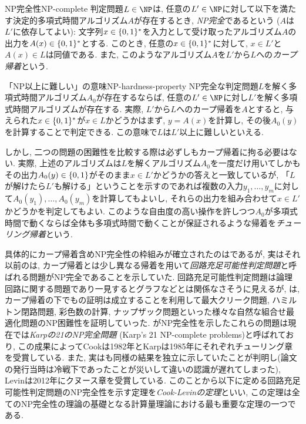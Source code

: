 \begin{definition}{NP完全性}{NP-complete}
  判定問題$L\in \NP$は, 任意の$L'\in\NP$に対して以下を満たす決定的多項式時間アルゴリズム$A$が存在するとき, \emph{NP完全}であるという ($A$は$L'$に依存してよい):
  文字列$x\in\{0,1\}^*$を入力として受け取ったアルゴリズム$A$の出力を$A(x)\in\{0,1\}^*$とする.
  このとき, 任意の$x\in\{0,1\}^*$に対して, $x\in L'$と$A(x)\in L$は同値である.
  また, このようなアルゴリズム$A$を$L'$から$L$への\emph{カープ帰着}という.
\end{definition}

\begin{remark}{「NP以上に難しい」の意味}{NP-hardness-property}
NP完全な判定問題$L$を解く多項式時間アルゴリズム$A_0$が存在するならば, 任意の$L'\in \NP$に対し$L'$を解く多項式時間アルゴリズムが存在する.
実際, $L'$から$L$へのカープ帰着を$A$とすると, 与えられた$x\in\{0,1\}^*$が$x\in L$かどうかはまず, $y=A(x)$を計算し, その後$A_0(y)$を計算することで判定できる.
この意味で$L$は$L'$以上に難しいといえる.

しかし, 二つの問題の困難性を比較する際は必ずしもカープ帰着に拘る必要はない.
実際, 上述のアルゴリズムは$L$を解くアルゴリズム$A_0$を一度だけ用いてしかもその出力$A_0(y)\in\{0,1\}$がそのまま$x\in L'$かどうかの答えと一致しているが, 「$L$が解けたら$L'$も解ける」ということを示すのであれば複数の入力$y_1,\dots,y_m$に対して$A_0(y_1),\dots,A_0(y_m)$を計算してもよいし, それらの出力を組み合わせて$x\in L'$かどうかを判定してもよい.
このような自由度の高い操作を許しつつ$A_0$が多項式時間で動くならば全体も多項式時間で動くことが保証されるような帰着を\emph{チューリング帰着}という.
\end{remark}

具体的にカープ帰着含めNP完全性の枠組みが確立されたのは\citet{Karp1972}であるが,
実はそれ以前の\citet{Cook1971}は, カープ帰着とは少し異なる帰着を用いて\emph{回路充足可能性判定問題}と呼ばれる問題がNP完全であることを示していた. 
回路充足可能性判定問題は論理回路に関する問題であり一見するとグラフなどとは関係なさそうに見えるが,
\citet{Karp1972}は, カープ帰着の下でも\cite{Cook1971}の証明は成立することを利用して最大クリーク問題, ハミルトン閉路問題, 彩色数の計算, ナップザック問題といった様々な自然な組合せ最適化問題のNP困難性を証明していった.
\citet{Karp1972}がNP完全性を示したこれらの問題は現在では\emph{Karpの21のNP完全問題} (Karp's 21 NP-complete problems)と呼ばれており,
この成果によってCookは1982年とKarpは1985年にそれぞれチューリング章を受賞している.
また, 実は\citet{Levin1973}も同様の結果を独立に示していたことが判明し(論文の発行当時は冷戦下であったことが災いして違いの認識が遅れてしまった), Levinは2012年にクヌース章を受賞している.
このことから以下に定める回路充足可能性判定問題のNP完全性を示す定理を\emph{Cook-Levinの定理}といい,
この定理は全てのNP完全性の理論の基礎となる計算量理論における最も重要な定理の一つである.


